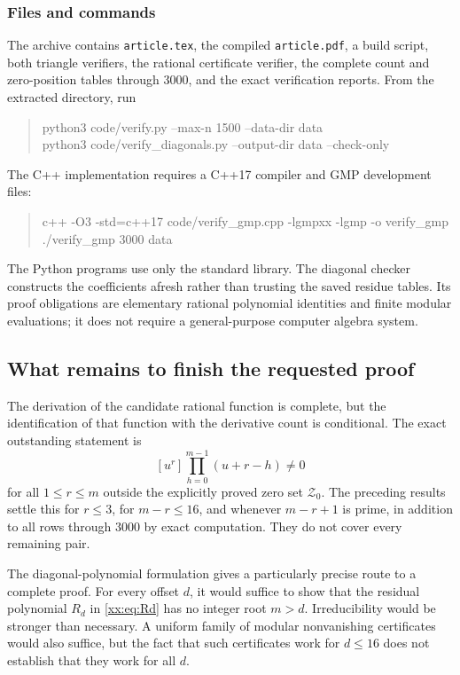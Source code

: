 \documentclass[11pt,a4paper]{article}
\numberwithin{equation}{section}
\theoremstyle{definition}
\theoremstyle{remark}
\theoremstyle{plain}
\newcommand{\ZZ}{\mathcal Z}
\newcommand{\coef}[2]{[#1^{#2}]}
\begin{document}
\subsubsection{Files and commands}
The archive contains \texttt{article.tex}, the compiled \texttt{article.pdf},
a build script, both triangle verifiers, the rational certificate verifier,
the complete count and zero-position tables through $3000$, and the exact
verification reports. From the extracted directory, run
\begin{quote}\ttfamily\small
python3 code/verify.py --max-n 1500 --data-dir data\\
python3 code/verify\_diagonals.py --output-dir data --check-only
\end{quote}
The C++ implementation requires a C++17 compiler and GMP development files:
\begin{quote}\ttfamily\small
c++ -O3 -std=c++17 code/verify\_gmp.cpp -lgmpxx -lgmp -o verify\_gmp\\
./verify\_gmp 3000 data
\end{quote}
The Python programs use only the standard library. The diagonal checker
constructs the coefficients afresh rather than trusting the saved residue
tables. Its proof obligations are elementary rational polynomial identities
and finite modular evaluations; it does not require a general-purpose
computer algebra system.

\subsection{What remains to finish the requested proof}

The derivation of the candidate rational function is complete, but the
identification of that function with the derivative count is conditional.
The exact outstanding statement is
\[
 \coef{u}{r}\prod_{h=0}^{m-1}(u+r-h)\ne0
\]
for all $1\le r\le m$ outside the explicitly proved zero set $\ZZ_0$.
The preceding results settle this for $r\le3$, for $m-r\le16$, and whenever
$m-r+1$ is prime, in addition to all rows through $3000$ by exact computation.
They do not cover every remaining pair.

The diagonal-polynomial formulation gives a particularly precise route to
a complete proof. For every offset $d$, it would suffice to show that the
residual polynomial $R_d$ in \eqref{xx:eq:Rd} has no integer root $m>d$.
Irreducibility would be stronger than necessary. A uniform family of
modular nonvanishing certificates would also suffice, but the fact that
such certificates work for $d\le16$ does not establish that they work for
all $d$.
\end{document}

